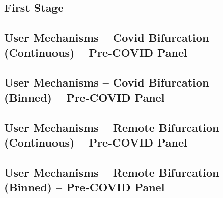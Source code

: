 \documentclass{article}
\newcommand{\cleanedresultsdir}{../results/cleaned}
\begin{document}
\subsection{First Stage}


\clearpage
\begin{landscape}
\section{User Mechanisms – Covid Bifurcation (Continuous) – Pre-COVID Panel}

\end{landscape}

\clearpage
\begin{landscape}
\section{User Mechanisms – Covid Bifurcation (Binned) – Pre-COVID Panel}

\end{landscape}

\clearpage
\begin{landscape}
\section{User Mechanisms – Remote Bifurcation (Continuous) – Pre-COVID Panel}

\end{landscape}

\clearpage
\begin{landscape}
\section{User Mechanisms – Remote Bifurcation (Binned) – Pre-COVID Panel}

\end{landscape}
\end{document}

